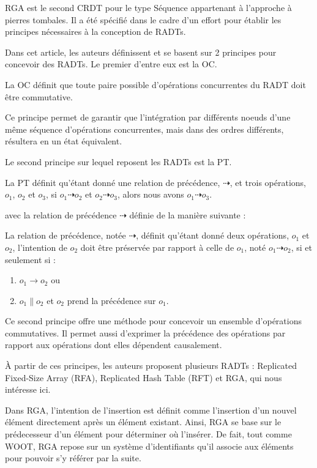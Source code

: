 \acf{RGA} \cite{ROH2011354} est le second \ac{CRDT} pour le type Séquence appartenant à l'approche à pierres tombales.
Il a été spécifié dans le cadre d'un effort pour établir les principes nécessaires à la conception de \acp{RADT}.

Dans cet article, les auteurs définissent et se basent sur 2 principes pour concevoir des \acp{RADT}.
Le premier d'entre eux est la \ac{OC}.
\begin{definition}[\acl{OC}]
  La \acf{OC} définit que toute paire possible d'opérations concurrentes du \ac{RADT} doit être commutative.
\end{definition}
Ce principe permet de garantir que l'intégration par différents noeuds d'une même séquence d'opérations concurrentes, mais dans des ordres différents, résultera en un état équivalent.

Le second principe sur lequel reposent les RADTs est la \ac{PT}.
\begin{definition}[\acl{PT}]
  La \acf{PT} définit qu'étant donné une relation de précédence, $\dashrightarrow$, et trois opérations, $o_1$, $o_2$ et $o_3$, si $o_1 \dashrightarrow o_2$ et $o_2 \dashrightarrow o_3$, alors nous avons $o_1 \dashrightarrow o_3$.
\end{definition}

avec la relation de précédence $\dashrightarrow$ définie de la manière suivante :
\begin{definition}
    La relation de précédence, notée $\dashrightarrow$, définit qu'étant donné deux opérations, $o_1$ et $o_2$, l'intention de $o_2$ doit être préservée par rapport à celle de $o_1$, noté $o_1 \dashrightarrow o_2$, si et seulement si :
    \begin{enumerate}
      \item $o_1 \rightarrow o_2$ ou
      \item $o_1 \parallel o_2$ et $o_2$ prend la précédence sur $o_1$.
    \end{enumerate}
\end{definition}
Ce second principe offre une méthode pour concevoir un ensemble d'opérations commutatives.
Il permet aussi d'exprimer la précédence des opérations par rapport aux opérations dont elles dépendent causalement.

À partir de ces principes, les auteurs proposent plusieurs \acp{RADT} : Replicated Fixed-Size Array (RFA), Replicated Hash Table (RFT) et \acf{RGA}, qui nous intéresse ici.

Dans \ac{RGA}, l'intention de l'insertion est définit comme l'insertion d'un nouvel élément directement après un élément existant.
Ainsi, \ac{RGA} se base sur le prédecesseur d'un élément pour déterminer où l'insérer.
De fait, tout comme WOOT, \ac{RGA} repose sur un système d'identifiants qu'il associe aux éléments pour pouvoir s'y référer par la suite.

